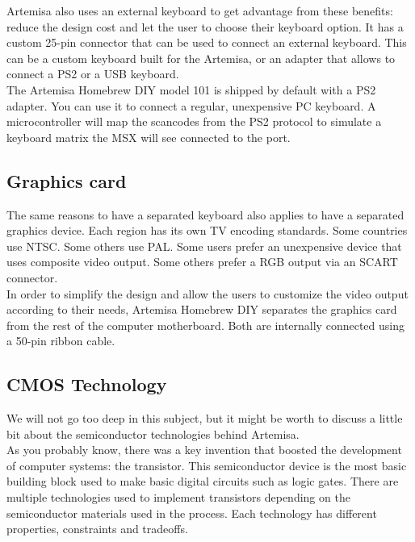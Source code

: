 Artemisa also uses an external keyboard to get advantage from these benefits: reduce the design cost and let the user to choose their keyboard option. It has a custom 25-pin connector that can be used to connect an external keyboard. This can be a custom keyboard built for the Artemisa, or an adapter that allows to connect a PS2 or a USB keyboard. \\

The Artemisa Homebrew DIY model 101 is shipped by default with a PS2 adapter. You can use it to connect a regular, unexpensive PC keyboard. A microcontroller will map the scancodes from the PS2 protocol to simulate a keyboard matrix the MSX will see connected to the port.

\subsection{Graphics card}

The same reasons to have a separated keyboard also applies to have a separated graphics device. Each region has its own TV encoding standards. Some countries use NTSC. Some others use PAL. Some users prefer an unexpensive device that uses composite video output. Some others prefer a RGB output via an SCART connector. \\

In order to simplify the design and allow the users to customize the video output according to their needs, Artemisa Homebrew DIY separates the graphics card from the rest of the computer motherboard. Both are internally connected using a 50-pin ribbon cable.

\subsection{CMOS Technology}

We will not go too deep in this subject, but it might be worth to discuss a little bit about the semiconductor technologies behind Artemisa. \\

As you probably know, there was a key invention that boosted the development of computer systems: the transistor. This semiconductor device is the most basic building block used to make basic digital circuits such as logic gates. There are multiple technologies used to implement transistors depending on the semiconductor materials used in the process. Each technology has different properties, constraints and tradeoffs. \\


